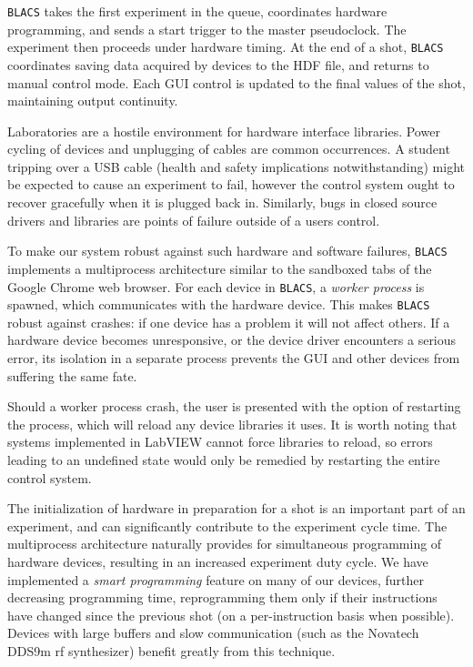 \texttt{BLACS} takes the first experiment in the queue, coordinates hardware programming, and sends a start trigger to the master pseudoclock.
The experiment then proceeds under hardware timing.
At the end of a shot, \texttt{BLACS} coordinates saving data acquired by devices to the HDF file, and returns to manual control mode.
Each GUI control is updated to the final values of the shot, maintaining output continuity.

Laboratories are a hostile environment for hardware interface libraries.
Power cycling of devices and unplugging of cables are common occurrences.
A student tripping over a USB cable (health and safety implications notwithstanding) might be expected to cause an experiment to fail, however the control system ought to recover gracefully when it is plugged back in.
Similarly, bugs in closed source drivers and libraries are points of failure outside of a users control.

To make our system robust against such hardware and software failures, \texttt{BLACS} implements a multiprocess architecture similar to the sandboxed tabs of the Google Chrome web browser\cite{barth_security_2008}.
For each device in \texttt{BLACS}, a \textit{worker process} is spawned, which communicates with the hardware device.
This makes \texttt{BLACS} robust against crashes: if one device has a problem it will not affect others.
If a hardware device becomes unresponsive, or the device driver encounters a serious error, its isolation in a separate process prevents the GUI and other devices from suffering the same fate.

Should a worker process crash, the user is presented with the option of restarting the process, which will reload any device libraries it uses.
It is worth noting that systems implemented in LabVIEW cannot force libraries to reload, so errors leading to an undefined state would only be remedied by restarting the entire control system.

The initialization of hardware in preparation for a shot is an important part of an experiment, and can significantly contribute to the experiment cycle time.
The multiprocess architecture naturally provides for simultaneous programming of hardware devices, resulting in an increased experiment duty cycle.
We have implemented a \textit{smart programming} feature on many of our devices, further decreasing programming time, reprogramming them only if their instructions have changed since the previous shot (on a per-instruction basis when possible).
Devices with large buffers and slow communication (such as the Novatech DDS9m rf synthesizer) benefit greatly from this technique.

